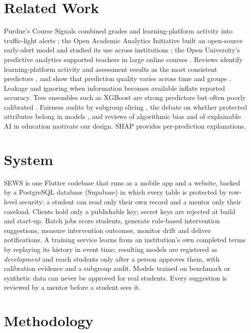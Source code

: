 \documentclass[conference]{IEEEtran}
\begin{document}
\section{Related Work}
Purdue's Course Signals combined grades and learning-platform activity into traffic-light alerts \cite{arnold2012};
the Open Academic Analytics Initiative built an open-source early-alert model and studied its use across
institutions \cite{jayaprakash2014}; the Open University's predictive analytics supported teachers in large online
courses \cite{hlosta2017, herodotou2019}. Reviews identify learning-platform activity and assessment results as the
most consistent predictors \cite{namoun2021, gardner2018}, and show that prediction quality varies across time and
groups \cite{glandorf2024}. Leakage \cite{kaufman2012} and ignoring when information becomes available \cite{le2026}
inflate reported accuracy. Tree ensembles such as XGBoost \cite{chen2016} are strong predictors but often poorly
calibrated \cite{niculescu2005}. Fairness audits by subgroup slicing \cite{gardner2019}, the debate on whether
protected attributes belong in models \cite{yu2021}, and reviews of algorithmic bias \cite{baker2022} and of
explainable AI in education \cite{khosravi2022} motivate our design. SHAP \cite{lundberg2017} provides
per-prediction explanations.

\section{System}
SEWS is one Flutter codebase that runs as a mobile app and a website, backed by a PostgreSQL database (Supabase)
in which every table is protected by row-level security: a student can read only their own record and a mentor
only their caseload. Clients hold only a publishable key; secret keys are rejected at build and start-up. Batch
jobs score students, generate rule-based intervention suggestions, measure intervention outcomes, monitor drift and
deliver notifications. A training service learns from an institution's own completed terms by replaying its
history in event time; resulting models are registered as \emph{development} and reach students only after a
person approves them, with calibration evidence and a subgroup audit. Models trained on benchmark or synthetic data
can never be approved for real students. Every suggestion is reviewed by a mentor before a student sees it.

\section{Methodology}
\end{document}
